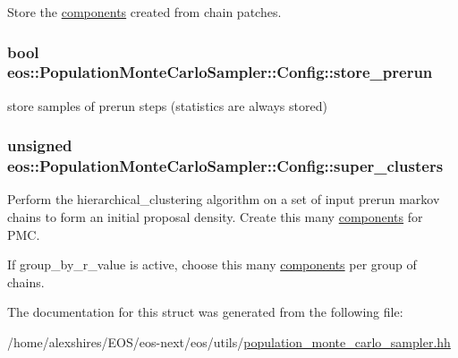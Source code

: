 Store the \hyperlink{namespaceeos_1_1components}{components} created from chain patches. \hypertarget{structeos_1_1PopulationMonteCarloSampler_1_1Config_a85cf9361f3660df01fa551d9ebd62040}{
\subsubsection[{store\_\-prerun}]{\setlength{\rightskip}{0pt plus 5cm}bool {\bf eos::PopulationMonteCarloSampler::Config::store\_\-prerun}}}
\label{structeos_1_1PopulationMonteCarloSampler_1_1Config_a85cf9361f3660df01fa551d9ebd62040}


store samples of prerun steps (statistics are always stored) \hypertarget{structeos_1_1PopulationMonteCarloSampler_1_1Config_a906c7eeded237f7bbe810a8d03d8402b}{
\subsubsection[{super\_\-clusters}]{\setlength{\rightskip}{0pt plus 5cm}unsigned {\bf eos::PopulationMonteCarloSampler::Config::super\_\-clusters}}}
\label{structeos_1_1PopulationMonteCarloSampler_1_1Config_a906c7eeded237f7bbe810a8d03d8402b}
Perform the hierarchical\_\-clustering algorithm on a set of input prerun markov chains to form an initial proposal density. Create this many \hyperlink{namespaceeos_1_1components}{components} for PMC.

If group\_\-by\_\-r\_\-value is active, choose this many \hyperlink{namespaceeos_1_1components}{components} per group of chains. 

The documentation for this struct was generated from the following file:\begin{DoxyCompactItemize}
\item 
/home/alexshires/EOS/eos-\/next/eos/utils/\hyperlink{population__monte__carlo__sampler_8hh}{population\_\-monte\_\-carlo\_\-sampler.hh}\end{DoxyCompactItemize}
